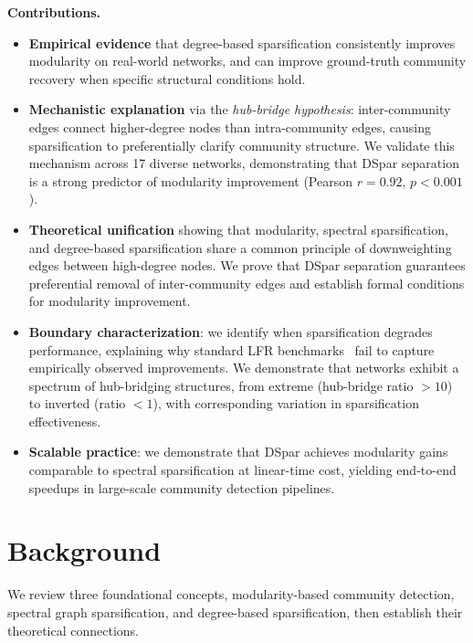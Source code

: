 \documentclass[10pt,journal,compsoc]{IEEEtran}
\begin{document}
\noindent\textbf{Contributions.}
\begin{itemize}
    \item \textbf{Empirical evidence} that degree-based sparsification consistently improves modularity on real-world networks, and can improve ground-truth community recovery when specific structural conditions hold.
    
    \item \textbf{Mechanistic explanation} via the \emph{hub-bridge hypothesis}: inter-community edges connect higher-degree nodes than intra-community edges, causing sparsification to preferentially clarify community structure. We validate this mechanism across 17 diverse networks, demonstrating that DSpar separation is a strong predictor of modularity improvement (Pearson $r = 0.92$, $p < 0.001$).
    
    \item \textbf{Theoretical unification} showing that modularity, spectral sparsification, and degree-based sparsification share a common principle of downweighting edges between high-degree nodes. We prove that DSpar separation guarantees preferential removal of inter-community edges and establish formal conditions for modularity improvement.
    
    \item \textbf{Boundary characterization}: we identify when sparsification degrades performance, explaining why standard LFR benchmarks~\cite{lancichinetti2008benchmark} fail to capture empirically observed improvements. We demonstrate that networks exhibit a spectrum of hub-bridging structures, from extreme (hub-bridge ratio $> 10$) to inverted (ratio $< 1$), with corresponding variation in sparsification effectiveness.
    
    \item \textbf{Scalable practice}: we demonstrate that DSpar achieves modularity gains comparable to spectral sparsification at linear-time cost, yielding end-to-end speedups in large-scale community detection pipelines.
\end{itemize}



\section{Background}
\label{sec:background}

We review three foundational concepts, modularity-based community detection, spectral graph sparsification, and degree-based sparsification, then establish 
their theoretical connections.
\end{document}
